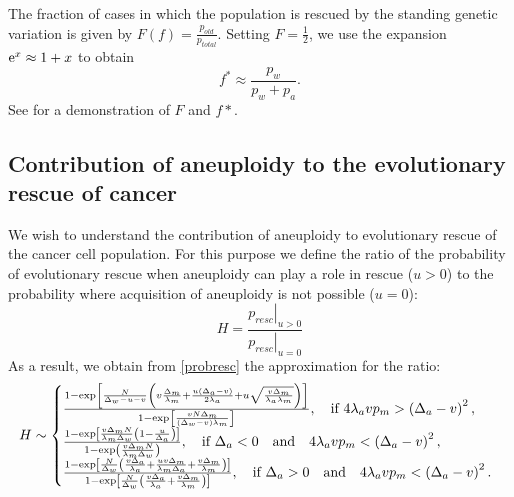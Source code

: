 \documentclass[12pt]{extarticle}
\newcommand{\e}{{\rm e}}
\begin{document}
The fraction of cases in which the population is rescued by the standing genetic variation is given by $F\left(f\right)=\frac{p_{old}}{p_{total}}$.
Setting $F=\frac{1}{2}$, we use the expansion $\e^x \approx 1+x$ to obtain
\begin{equation}\label{halfeqstandvar}
f^*\approx\frac{p_w}{p_w+p_a}.
\end{equation}
See  for a demonstration of $F$ and $f*$.

\subsection*{Contribution of aneuploidy to the evolutionary rescue of cancer}
We wish to understand the contribution of aneuploidy to evolutionary rescue of the cancer cell population. For this purpose we define the ratio of the probability of evolutionary rescue when aneuploidy can play a role in rescue ($u>0$) to the probability where acquisition of aneuploidy is not possible ($u=0$):
\begin{equation}\label{ratiorescueexact}
H=\frac{\left.p_{resc}\right|_{u>0}}{\left.p_{resc}\right|_{u=0}}
\end{equation}
As a result, we obtain from \eqref{probresc} the approximation for the ratio:
\begin{equation}\label{ratiorescue}
H\sim\left\{
  \begin{array}{@{}ll@{}}
  \frac{1-\exp\left[\frac{N}{\Delta_w-u-v}\left(v\frac{\Delta_m}{\lambda_m}+\frac{u\left(\Delta_a-v\right)}{2\lambda_a}+u\sqrt{\frac{v\Delta_m}{\lambda_a\lambda_m}}\right)\right]}{1-\exp\left[\frac{vN\Delta_m}{\left(\Delta_w-v\right)\lambda_m}\right]},\quad\text{if }4\lambda_avp_m>\left(\Delta_a-v\right)^2,\\
   \frac{1-\exp\left[\frac{v\Delta_mN}{\lambda_m\Delta_w}\left(1-\frac{u}{\Delta_a}\right)\right]}{1-\exp\left(\frac{v\Delta_mN}{\lambda_m\Delta_w}\right)},\quad\text{if }\Delta_a<0\quad\text{and}\quad4\lambda_avp_m<\left(\Delta_a-v\right)^2,\\
   \frac{1-\exp\left[\frac{N}{\Delta_w}\left(\frac{v\Delta_a}{\lambda_a}+\frac{uv\Delta_m}{\lambda_m\Delta_a}+\frac{v\Delta_m}{\lambda_m}\right)\right]}{1-\exp\left[\frac{N}{\Delta_w}\left(\frac{v\Delta_a}{\lambda_a}+\frac{v\Delta_m}{\lambda_m}\right)\right]},\quad\text{if }\Delta_a>0\quad\text{and}\quad4\lambda_avp_m<\left(\Delta_a-v\right)^2.
  \end{array}\right.
\end{equation}
\end{document}
